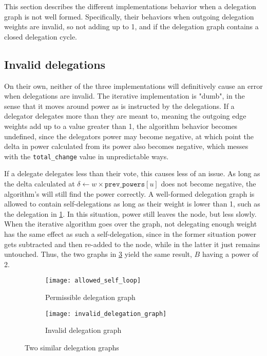 This section describes the different implementations behavior when a delegation graph is not well formed. Specifically, their behaviors when outgoing delegation weights are invalid, so not adding up to 1, and if the delegation graph contains a closed delegation cycle. 

\subsection{Invalid delegations}

On their own, neither of the three implementations will definitively cause an error when delegations are invalid. The iterative implementation is "dumb", in the sense that it moves around power as is instructed by the delegations. If a delegator delegates more than they are meant to, meaning the outgoing edge weights add up to a value greater than 1, the algorithm behavior becomes undefined, since the delegators power may become negative, at which point the delta in power calculated from its power also becomes negative, which messes with the \texttt{total\_change} value in unpredictable ways. 

If a delegate delegates less than their vote, this causes less of an issue. As long as the delta calculated at $\delta \gets w \times \texttt{prev\_powers}[u]$ does not become negative, the algorithm's will still find the power correctly. A well-formed delegation graph is allowed to contain self-delegations as long as their weight is lower than 1, such as the delegation in \cref{subfig:permissible-self-delegation}. In this situation, power still leaves the node, but less slowly. When the iterative algorithm goes over the graph, not delegating enough weight has the same effect as such a self-delegation, since in the former situation  power gets subtracted and then re-added to the node, while in the latter it just remains untouched. Thus, the two graphs in \cref{fig:small-delegation-graphs} yield the same result, $B$ having a power of 2.

\begin{figure}[t]
    \centering
    \begin{subfigure}[t]{0.45\textwidth}
	\centering
	\texttt{[image: allowed\_self\_loop]}
	\caption{Permissible delegation graph}
	\label{subfig:permissible-self-delegation}
    \end{subfigure}
    \hfill
    \begin{subfigure}[t]{0.45\textwidth}
        \centering
        \texttt{[image: invalid\_delegation\_graph]}
        \caption{Invalid delegation graph}
         \label{subfig:invalid-delegation-graph} 
    \end{subfigure}
    \caption{Two similar delegation graphs}
    \label{fig:small-delegation-graphs}
\end{figure}

